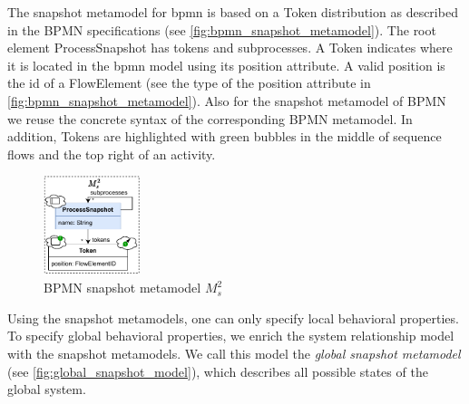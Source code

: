 \documentclass{jot}
\begin{document}
The snapshot metamodel for \gls*{bpmn} is based on a \textsf{Token} distribution as described in the BPMN specifications \cite{objectmanagementgroupBusinessProcessModel2013} (see \autoref{fig:bpmn_snapshot_metamodel}). 
The root element \textsf{ProcessSnapshot} has \textsf{tokens} and \textsf{subprocesses}.
A \textsf{Token} indicates where it is located in the \gls*{bpmn} model using its \textsf{position} attribute.
A valid \textsf{position} is the \textsf{id} of a \textsf{FlowElement} (see the type of the \textsf{position} attribute in \autoref{fig:bpmn_snapshot_metamodel}).
Also for the snapshot metamodel of BPMN we reuse the concrete syntax of the corresponding BPMN metamodel. 
In addition, \textsf{Token}s are highlighted with green bubbles in the middle of sequence flows and the top right of an activity.

\begin{figure}[h]
    \centering
    \includegraphics[width=0.25\textwidth]{figures/bpmn_s_model.pdf}
    \caption{BPMN snapshot metamodel $M_s^2$}
    \label{fig:bpmn_snapshot_metamodel}
\end{figure}

Using the snapshot metamodels, one can only specify local behavioral properties.
To specify global behavioral properties, we enrich the system relationship model with the snapshot metamodels. 
We call this model the \emph{global snapshot metamodel} (see \autoref{fig:global_snapshot_model}), which describes all possible states of the global system.

\end{document}
